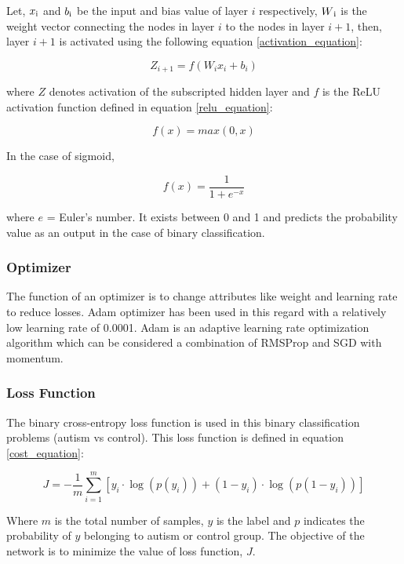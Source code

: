 Let, $x\textsubscript{i}$ and $b\textsubscript{i}$ be the input and bias value of layer $i$ respectively, $W\textsubscript{i}$ is the weight vector
connecting the nodes in layer $i$ to the nodes in layer $i+1$, then, layer $i+1$ is activated using
the following equation \ref{activation_equation}:

\begin{equation}
Z_{i+1}=f(W_{i}x_{i}+b_{i})
\label{activation_equation}
\end{equation}

where $Z$ denotes activation of the subscripted hidden layer and $f$ is the ReLU activation function defined in equation \ref{relu_equation}: 

\begin{equation}
f(x)=max⁡(0,x)
\label{relu_equation}
\end{equation}

In the case of sigmoid,

\begin{equation}
f(x)=\frac{1}{1+e{^{-x}}}
\label{sigmoid_equation}
\end{equation}

where $e$ = Euler’s number. It exists between 0 and 1 and predicts the probability value as an output in the case of binary classification.

\subsubsection{Optimizer}
The function of an optimizer is to change attributes like weight and learning rate to reduce
losses. Adam optimizer has been used in this regard with a relatively low learning rate of
0.0001. Adam is an adaptive learning rate optimization algorithm which can be considered a
combination of RMSProp and SGD with momentum.

\subsubsection{Loss Function}
The binary cross-entropy loss function is used in this binary classification problems (autism vs
control). This loss function is defined in equation \ref{cost_equation}:

\begin{equation}
J=-\frac{1}{m}\sum_{i=1}^{m}[y_{i}\cdot\log({p({y_{i}})})+(1
-y_{i})\cdot\log({p({1-y_{i}})})]
\label{cost_equation}
\end{equation}

Where $m$ is the total number of samples, $y$ is the label and $p$ indicates the probability of $y$
belonging to autism or control group. The objective of the network is to minimize the value
of loss function, $J$.\\

